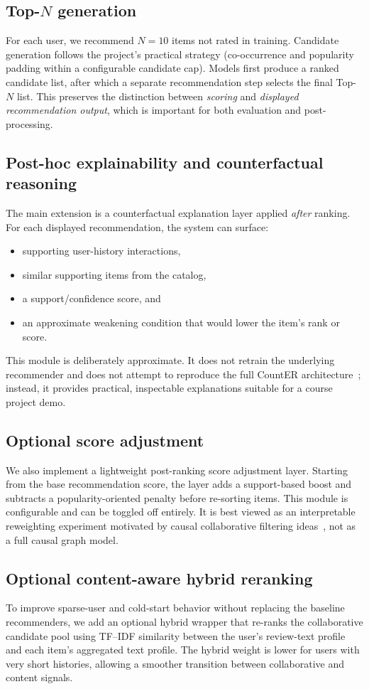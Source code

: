 \documentclass[sigconf,nonacm]{acmart}
\begin{document}
\subsection{Top-$N$ generation}
For each user, we recommend $N{=}10$ items not rated in training. Candidate generation follows the project's practical strategy (co-occurrence and popularity padding within a configurable candidate cap). Models first produce a ranked candidate list, after which a separate recommendation step selects the final Top-$N$ list. This preserves the distinction between \emph{scoring} and \emph{displayed recommendation output}, which is important for both evaluation and post-processing.

\subsection{Post-hoc explainability and counterfactual reasoning}
The main extension is a counterfactual explanation layer applied \emph{after} ranking. For each displayed recommendation, the system can surface:
\begin{itemize}
  \item supporting user-history interactions,
  \item similar supporting items from the catalog,
  \item a support/confidence score, and
  \item an approximate weakening condition that would lower the item's rank or score.
\end{itemize}
This module is deliberately approximate. It does not retrain the underlying recommender and does not attempt to reproduce the full CountER architecture~\cite{tan2021counterfactual}; instead, it provides practical, inspectable explanations suitable for a course project demo.

\subsection{Optional score adjustment}
We also implement a lightweight post-ranking score adjustment layer. Starting from the base recommendation score, the layer adds a support-based boost and subtracts a popularity-oriented penalty before re-sorting items. This module is configurable and can be toggled off entirely. It is best viewed as an interpretable reweighting experiment motivated by causal collaborative filtering ideas~\cite{xu2021causal}, not as a full causal graph model.

\subsection{Optional content-aware hybrid reranking}
To improve sparse-user and cold-start behavior without replacing the baseline recommenders, we add an optional hybrid wrapper that re-ranks the collaborative candidate pool using TF--IDF similarity between the user's review-text profile and each item's aggregated text profile. The hybrid weight is lower for users with very short histories, allowing a smoother transition between collaborative and content signals.
\end{document}

